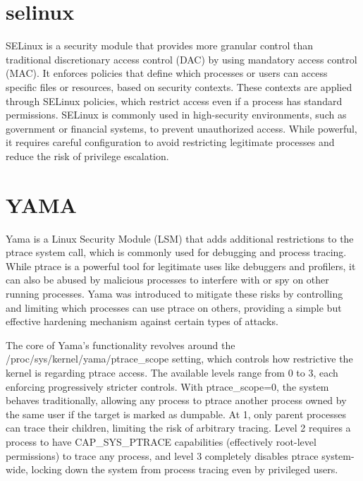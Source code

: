 \documentclass[12pt]{report}
\begin{document}
\begin{doublespace}
\section{selinux}
SELinux is a security module that provides more granular control than traditional discretionary access control (DAC) by using mandatory access control (MAC). It enforces policies that define which processes or users can access specific files or resources, based on security contexts. These contexts are applied through SELinux policies, which restrict access even if a process has standard permissions. SELinux is commonly used in high-security environments, such as government or financial systems, to prevent unauthorized access. While powerful, it requires careful configuration to avoid restricting legitimate processes and reduce the risk of privilege escalation.













\section{YAMA}


Yama is a Linux Security Module (LSM) that adds additional restrictions to the ptrace system call, which is commonly used for debugging and process tracing. While ptrace is a powerful tool for legitimate uses like debuggers and profilers, it can also be abused by malicious processes to interfere with or spy on other running processes. Yama was introduced to mitigate these risks by controlling and limiting which processes can use ptrace on others, providing a simple but effective hardening mechanism against certain types of attacks.

The core of Yama’s functionality revolves around the /proc/sys/kernel/yama/ptrace\_scope setting, which controls how restrictive the kernel is regarding ptrace access. The available levels range from 0 to 3, each enforcing progressively stricter controls. With ptrace\_scope=0, the system behaves traditionally, allowing any process to ptrace another process owned by the same user if the target is marked as dumpable. At 1, only parent processes can trace their children, limiting the risk of arbitrary tracing. Level 2 requires a process to have CAP\_SYS\_PTRACE capabilities (effectively root-level permissions) to trace any process, and level 3 completely disables ptrace system-wide, locking down the system from process tracing even by privileged users.


\end{doublespace}
\end{document}

